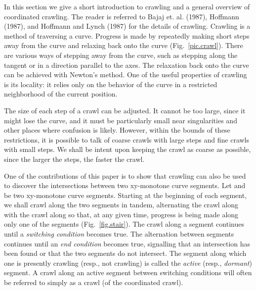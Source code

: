 In this section we give a short introduction to crawling and a general overview
of coordinated crawling.
The reader is referred to Bajaj et. al. (1987), Hoffmann (1987), and Hoffmann and Lynch (1987) 
for the details of crawling.
Crawling is a method of traversing a curve.  
Progress is made by repeatedly making short steps away from the curve and
relaxing back onto the curve (Fig.~\ref{pic.crawl}).
There are various ways of stepping away from the curve, such as stepping
along the tangent or in a direction parallel to the axes.
The relaxation back onto the curve can be achieved with Newton's method.
One of the useful properties of crawling is its locality: it relies only on the
behavior of the curve in a restricted neighborhood of the current position.


The size of each step of a crawl can be adjusted.
It cannot be too large, since it might lose the curve, and it must be particularly
small near singularities and other places where confusion is likely.
However, within the bounds of these restrictions, it is possible to talk of 
coarse crawls with large steps and fine crawls with small steps.
We shall be intent upon keeping the crawl as coarse as possible,
since the larger the steps, the faster the crawl.

One of the contributions of this paper is to show that crawling can also be used to 
discover the intersections between two xy-monotone curve segments.
Let  and  be two xy-monotone curve segments.
Starting at the beginning of each segment, we shall crawl along the two segments in 
tandem, alternating the crawl along  with the crawl along  so that,
at any given time, progress is being made along only one of the segments 
(Fig.~\ref{fig.stair}).
The crawl along a segment continues until a {\em switching condition} becomes true.
The alternation between segments continues until an {\em end condition} becomes true, 
signalling that an intersection has been found or that the two segments do not intersect.
The segment along which one is presently crawling (resp., not crawling) is called the 
{\em active} (resp., {\em dormant}) segment.
A crawl along an active segment between switching conditions
will often be referred to simply as a crawl (of the coordinated crawl).


